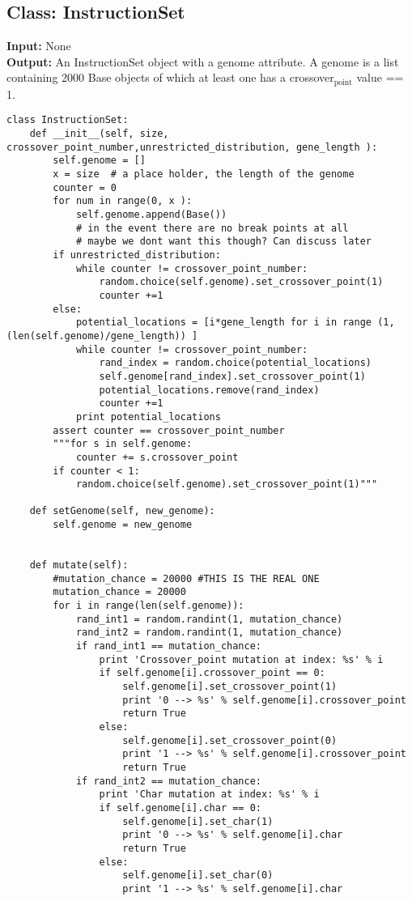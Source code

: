 \documentclass[a4paper]{article}
\begin{document}
\subsection{Class: InstructionSet}
\label{sec-6-3}
\textbf{Input:} None\\
\textbf{Output:} An InstructionSet object with a genome attribute. A genome is a list containing 2000 Base objects of which at least one has a crossover$_{\text{point}}$ value == 1.\\
\begin{verbatim}
class InstructionSet:
    def __init__(self, size, crossover_point_number,unrestricted_distribution, gene_length ):
        self.genome = []
        x = size  # a place holder, the length of the genome
        counter = 0 
        for num in range(0, x ):
            self.genome.append(Base())
            # in the event there are no break points at all
            # maybe we dont want this though? Can discuss later
        if unrestricted_distribution:
            while counter != crossover_point_number:
                random.choice(self.genome).set_crossover_point(1)
                counter +=1 
        else:
            potential_locations = [i*gene_length for i in range (1, (len(self.genome)/gene_length)) ]
            while counter != crossover_point_number:
                rand_index = random.choice(potential_locations)
                self.genome[rand_index].set_crossover_point(1)
                potential_locations.remove(rand_index)
                counter +=1
            print potential_locations
        assert counter == crossover_point_number 
        """for s in self.genome:
            counter += s.crossover_point
        if counter < 1:
            random.choice(self.genome).set_crossover_point(1)"""

    def setGenome(self, new_genome):
        self.genome = new_genome


    def mutate(self):
        #mutation_chance = 20000 #THIS IS THE REAL ONE
        mutation_chance = 20000
        for i in range(len(self.genome)):
            rand_int1 = random.randint(1, mutation_chance)
            rand_int2 = random.randint(1, mutation_chance)
            if rand_int1 == mutation_chance:
                print 'Crossover_point mutation at index: %s' % i
                if self.genome[i].crossover_point == 0:
                    self.genome[i].set_crossover_point(1)
                    print '0 --> %s' % self.genome[i].crossover_point
                    return True
                else:
                    self.genome[i].set_crossover_point(0)
                    print '1 --> %s' % self.genome[i].crossover_point
                    return True
            if rand_int2 == mutation_chance:
                print 'Char mutation at index: %s' % i
                if self.genome[i].char == 0:
                    self.genome[i].set_char(1)
                    print '0 --> %s' % self.genome[i].char
                    return True
                else:
                    self.genome[i].set_char(0) 
                    print '1 --> %s' % self.genome[i].char
\end{verbatim}
\end{document}
